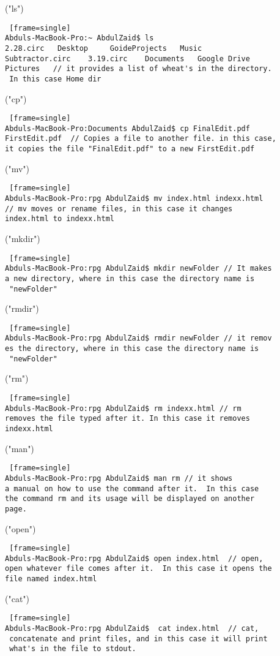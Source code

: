 \documentclass[12pt, oneside]{amsart}   	%
\begin{document}
 ("ls")
 \begin{lstlisting} [frame=single]
Abduls-MacBook-Pro:~ AbdulZaid$ ls
2.28.circ	Desktop		GoideProjects	Music
Subtractor.circ    3.19.circ	Documents	Google Drive
Pictures   // it provides a list of wheat's in the directory.
 In this case Home dir
\end{lstlisting} 

("cp")
 \begin{lstlisting} [frame=single]
Abduls-MacBook-Pro:Documents AbdulZaid$ cp FinalEdit.pdf 
FirstEdit.pdf  // Copies a file to another file. in this case,
it copies the file "FinalEdit.pdf" to a new FirstEdit.pdf
\end{lstlisting} 

("mv")
 \begin{lstlisting} [frame=single]
Abduls-MacBook-Pro:rpg AbdulZaid$ mv index.html indexx.html
// mv moves or rename files, in this case it changes
index.html to indexx.html
\end{lstlisting} 


("mkdir")
 \begin{lstlisting} [frame=single]
Abduls-MacBook-Pro:rpg AbdulZaid$ mkdir newFolder // It makes
a new directory, where in this case the directory name is
 "newFolder"
\end{lstlisting} 

("rmdir")
 \begin{lstlisting} [frame=single]
Abduls-MacBook-Pro:rpg AbdulZaid$ rmdir newFolder // it remov
es the directory, where in this case the directory name is
 "newFolder"
\end{lstlisting} 

("rm")
 \begin{lstlisting} [frame=single]
Abduls-MacBook-Pro:rpg AbdulZaid$ rm indexx.html // rm 
removes the file typed after it. In this case it removes 
indexx.html
\end{lstlisting} 

("man")
 \begin{lstlisting} [frame=single]
Abduls-MacBook-Pro:rpg AbdulZaid$ man rm // it shows
a manual on how to use the command after it.  In this case
the command rm and its usage will be displayed on another
page.
\end{lstlisting} 

("open")
 \begin{lstlisting} [frame=single]
Abduls-MacBook-Pro:rpg AbdulZaid$ open index.html  // open,
open whatever file comes after it.  In this case it opens the 
file named index.html
\end{lstlisting} 

("cat")
 \begin{lstlisting} [frame=single]
Abduls-MacBook-Pro:rpg AbdulZaid$  cat index.html  // cat,
 concatenate and print files, and in this case it will print
 what's in the file to stdout.
\end{lstlisting} 
\end{document}
